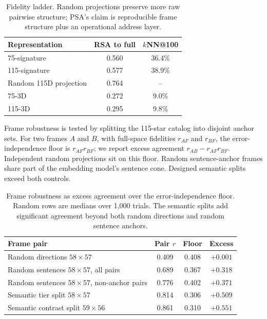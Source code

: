 \documentclass[11pt]{article}
\begin{document}
\begin{table}[t]
\centering
\small
\begin{tabular}{@{}lcc@{}}
\toprule
Representation & RSA to full & $k$NN@100 \\
\midrule
75-signature & 0.560 & 36.4\% \\
115-signature & 0.577 & 38.9\% \\
Random 115D projection & 0.764 & -- \\
75-3D & 0.272 & 9.0\% \\
115-3D & 0.295 & 9.8\% \\
\bottomrule
\end{tabular}
\caption{Fidelity ladder. Random projections preserve more raw pairwise structure; PSA's claim is reproducible frame structure plus an operational address layer.}
\label{tab:fidelity}
\end{table}

Frame robustness is tested by splitting the 115-star catalog into disjoint anchor sets. For two frames $A$ and $B$, with full-space fidelities $r_{AF}$ and $r_{BF}$, the error-independence floor is $r_{AF}r_{BF}$; we report excess agreement $r_{AB}-r_{AF}r_{BF}$. Independent random projections sit on this floor. Random sentence-anchor frames share part of the embedding model's sentence cone. Designed semantic splits exceed both controls.

\begin{table}[t]
\centering
\small
\begin{tabular}{@{}lccc@{}}
\toprule
Frame pair & Pair $r$ & Floor & Excess \\
\midrule
Random directions $58{\times}57$ & 0.409 & 0.408 & $+0.001$ \\
Random sentences $58{\times}57$, all pairs & 0.689 & 0.367 & $+0.318$ \\
Random sentences $58{\times}57$, non-anchor pairs & 0.776 & 0.402 & $+0.371$ \\
Semantic tier split $58{\times}57$ & 0.814 & 0.306 & $+0.509$ \\
Semantic contrast split $59{\times}56$ & 0.861 & 0.310 & $+0.551$ \\
\bottomrule
\end{tabular}
\caption{Frame robustness as excess agreement over the error-independence floor. Random rows are medians over 1,000 trials. The semantic splits add significant agreement beyond both random directions and random sentence anchors.}
\label{tab:excess}
\end{table}
\end{document}
